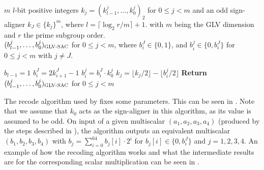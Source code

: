 \begin{algorithm}
	\algorithmicrequire $m$ $l$-bit positive integers $k_j = (k_{l - 1}^j, \ldots, k_0^j)_2$ for $0 \le j < m$ and an odd sign-aligner $k_J \in \{k_j\}^m$, where $l = \lceil \log_{2} r/m \rceil + 1$. with $m$ being the GLV dimension and $r$ the prime subgroup order. \\
	\algorithmicensure $(b_{l - 1}^j, \ldots, b_0^j)_{\textsc{GLV-SAC}}$ for $0 \le j < m$, where $b_i^J \in \{0, 1\} $, and $b_i^j \in \{0, b_i^J\}$ for $0 \le j < m$ with $j \neq J$.
	\begin{algorithmic}[1]
		\State $b_{l - 1} = 1$
		 \label{lst:scalar recoding general:signed-nonzero start}
			\State $b_i^J = 2k_{i + 1}^J - 1$ \label{lst:scalar recoding general:signed-nonzero oper}
		\EndFor \label{lst:scalar recoding general:signed-nonzero end}
				\State $b_i^j = b_i^J \cdot k_0^j$ \label{lst:scalar recoding general:digit column value}
				\State $k_j = \lfloor k_j / 2\rfloor - \lfloor b_i^j / 2 \rfloor$ \label{lst:scalar recoding general:scalar update}
			\EndFor
		\EndFor
		\State \textbf{Return} $(b_{l-1}^j, \ldots, b_0^j)_{\textsc{GLV-SAC}}$ for $0 \le j < m$
	\end{algorithmic}
	\label{algo: Protected Recoding Algorithm for the GLV-SAC Representation}
\end{algorithm}
%
The recode algorithm used by {\fourq} fixes some parameters.
This can be seen in .
Note that we assume that $k_0$ acts as the sign-aligner in this algorithm, as its value is assumed to be odd.
On input of a given multiscalar $(a_1, a_2, a_3, a_4)$ (produced by the steps described in ), the algorithm outputs an equivalent multiscalar $(b_1, b_2, b_3, b_4)$ with $b_j = \sum_{i = 0}^{64} b_j [i] \cdot 2^i$ for $b_j[i] \in \{0, b_i^J \}$ and $j = 1,2,3,4$.
An example of how the recoding algorithm works and what the intermediate results are for the corresponding scalar multiplication can be seen in \cite[Example 1]{faz2015efficient}.
%

